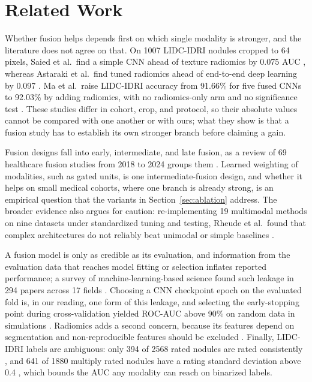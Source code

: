 \documentclass[conference]{IEEEtran}
\begin{document}
\section{Related Work}\label{sec:related}

Whether fusion helps depends first on which single modality is stronger, and the literature does not agree on that. On 1007 LIDC-IDRI nodules cropped to 64 pixels, Saied et al.\ find a simple CNN ahead of texture radiomics by 0.075 AUC \cite{saied_efficient_2023}, whereas Astaraki et al.\ find tuned radiomics ahead of end-to-end deep learning by 0.097 \cite{astaraki_comparative_2021}. Ma et al.\ raise LIDC-IDRI accuracy from 91.66\% for five fused CNNs to 92.03\% by adding radiomics, with no radiomics-only arm and no significance test \cite{ma_novel_2023}. These studies differ in cohort, crop, and protocol, so their absolute values cannot be compared with one another or with ours; what they show is that a fusion study has to establish its own stronger branch before claiming a gain.

Fusion designs fall into early, intermediate, and late fusion, as a review of 69 healthcare fusion studies from 2018 to 2024 groups them \cite{teoh_fusion_2024}. Learned weighting of modalities, such as gated units, is one intermediate-fusion design, and whether it helps on small medical cohorts, where one branch is already strong, is an empirical question that the variants in Section~\ref{sec:ablation} address. The broader evidence also argues for caution: re-implementing 19 multimodal methods on nine datasets under standardized tuning and testing, Rheude et al.\ found that complex architectures do not reliably beat unimodal or simple baselines \cite{rheude_fusion_2025}.

A fusion model is only as credible as its evaluation, and information from the evaluation data that reaches model fitting or selection inflates reported performance; a survey of machine-learning-based science found such leakage in 294 papers across 17 fields \cite{kapoor_leakage_2023}. Choosing a CNN checkpoint epoch on the evaluated fold is, in our reading, one form of this leakage, and selecting the early-stopping point during cross-validation yielded ROC-AUC above 90\% on random data in simulations \cite{rajabi_early_2024}. Radiomics adds a second concern, because its features depend on segmentation and non-reproducible features should be excluded \cite{neha_radiomics_2026}. Finally, LIDC-IDRI labels are ambiguous: only 394 of 2568 rated nodules are rated consistently \cite{liao_ambiguous_2022}, and 641 of 1880 multiply rated nodules have a rating standard deviation above 0.4 \cite{konuksever_dynamic_2026}, which bounds the AUC any modality can reach on binarized labels.
\end{document}
